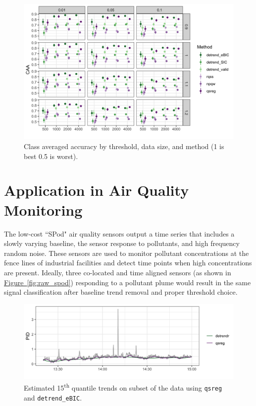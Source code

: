 \documentclass[12pt]{article}
\newcommand{\Fig}[1]{\hyperref[fig:#1]{Figure~\ref*{fig:#1}}} %
\newcommand{\Fig}[1]{{Figure~\ref{fig:#1}}} %
\begin{document}
	\begin{figure}[h!]
		\includegraphics[width = \linewidth]{Figures/peaks_CAA.png}
		\caption{Class averaged accuracy by threshold, data size, and method (1 is best 0.5 is worst).}
	\end{figure}


	\FloatBarrier

\section{Application in Air Quality Monitoring}

	\label{sec:application}
	The low-cost ``SPod" air quality sensors output a time series that includes a slowly varying baseline, 
	the sensor response to pollutants, and high frequency random noise. These sensors are used to monitor pollutant concentrations at the fence lines of industrial facilities and detect time points when high concentrations are present. Ideally, three co-located and time aligned sensors (as shown in \Fig{raw_spod}) responding to a pollutant plume would result in the same signal classification after baseline trend removal and proper threshold choice. 

	
	\begin{figure}
		\includegraphics[width = \linewidth]{Figures/short_trends.png}
		\caption{Estimated 15\textsuperscript{th} quantile trends on subset of the data using \texttt{qsreg} and \texttt{detrend\_eBIC}.} 
		\label{fig:short-trends}
	\end{figure}
\end{document}
